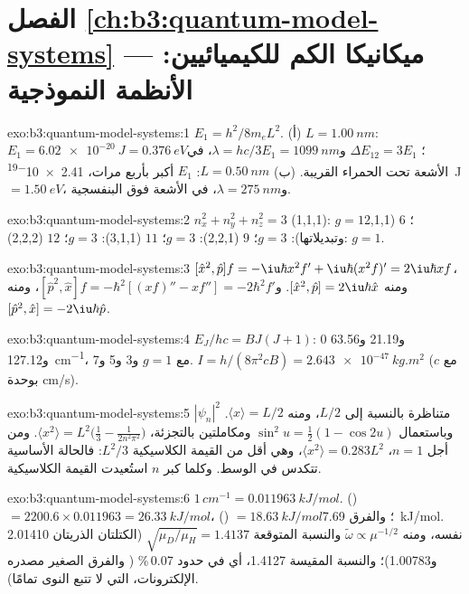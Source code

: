 \section*{الفصل \ref{ch:b3:quantum-model-systems} --- ميكانيكا الكم للكيميائيين: الأنظمة النموذجية}

\begin{solution}{exo:b3:quantum-model-systems:1}
$E_1 = h^2/8m_eL^2$. (أ) $L = \qty{1.00}{nm}$: $E_1 = \qty{6.02e-20}{J} =
\qty{0.376}{eV}$؛ $\Delta E_{12} = 3E_1$ و$\lambda = hc/3E_1 =
\qty{1099}{nm}$، في الأشعة تحت الحمراء القريبة. (ب) $L = \qty{0.50}{nm}$: $E_1$ أكبر
بأربع مرات، \qty{2.41e-19}{J} $= \qty{1.50}{eV}$، و$\lambda =
\qty{275}{nm}$، في الأشعة فوق البنفسجية.
\end{solution}

\begin{solution}{exo:b3:quantum-model-systems:2}
$n_x^2 + n_y^2 + n_z^2 = 3$ (1,1,1): $g = 1$؛ $6$ (2,1,1 وتبديلاتها):
$g = 3$؛ $9$ (2,2,1): $g = 3$؛ $11$ (3,1,1): $g = 3$؛ $12$ (2,2,2): $g = 1$.
\end{solution}

\begin{solution}{exo:b3:quantum-model-systems:3}
$[\hat x^2,\hat p]f = -\iu\hbar x^2f' + \iu\hbar(x^2f)' = 2\iu\hbar xf$، ومنه
$[\hat x^2,\hat p] = 2\iu\hbar\hat x$. و$[\hat p^2,\hat x]f = -\hbar^2[(xf)'' -
xf''] = -2\hbar^2f'$، ومنه $[\hat p^2,\hat x] = -2\iu\hbar\hat p$.
\end{solution}

\begin{solution}{exo:b3:quantum-model-systems:4}
$E_J/hc = BJ(J+1)$: 0 و21.19 و63.56 و\qty{127.12}{cm^{-1}}، مع $g = 1$
و3 و5 و7. $I = h/(8\pi^2cB) = \qty{2.643e-47}{kg.m^2}$ (مع $c$ بوحدة
\unit{cm/s}).
\end{solution}

\begin{solution}{exo:b3:quantum-model-systems:5}
$|\psi_n|^2$ متناظرة بالنسبة إلى $L/2$، ومنه $\langle x\rangle = L/2$. وباستعمال
$\sin^2u = \frac12(1 - \cos2u)$ ومكاملتين بالتجزئة،
$\langle x^2\rangle = L^2\big(\frac13 - \frac{1}{2n^2\pi^2}\big)$. ومن أجل $n = 1$،
$\langle x^2\rangle = 0.283L^2$، وهي أقل من القيمة الكلاسيكية $L^2/3$: فالحالة
الأساسية تتكدس في الوسط. وكلما كبر $n$ استُعيدت القيمة الكلاسيكية.
\end{solution}

\begin{solution}{exo:b3:quantum-model-systems:6}
$1\,\unit{cm^{-1}} = \qty{0.011963}{kJ/mol}$.  () $= 2200.6 \times
0.011963 = \qty{26.33}{kJ/mol}$،  () $= \qty{18.63}{kJ/mol}$؛ والفرق
\qty{7.69}{kJ/mol}.  نفسه، ومنه $\tilde\omega \propto \mu^{-1/2}$
والنسبة المتوقعة $\sqrt{\mu_D/\mu_H} = 1.4137$ (الكتلتان الذريتان
2.01410 و1.00783)؛ والنسبة المقيسة 1.4127، أي في حدود 0.07\,\% (
والفرق الصغير مصدره الإلكترونات، التي لا تتبع النوى
تمامًا).
\end{solution}

